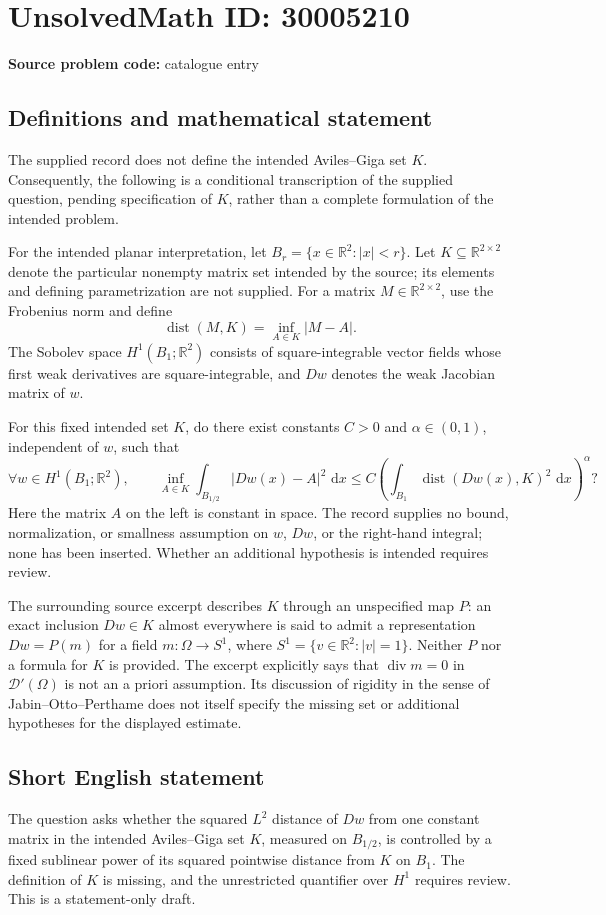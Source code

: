 \documentclass[11pt]{article}
\newcommand{\R}{\mathbb{R}}
\newcommand{\dd}{\,\mathrm{d}}
\begin{document}
\section*{UnsolvedMath ID: 30005210}
\textbf{Source problem code:} catalogue entry
\subsection{Definitions and mathematical statement}
The supplied record does not define the intended Aviles--Giga set \(K\). Consequently, the following is a conditional transcription of the supplied question, pending specification of \(K\), rather than a complete formulation of the intended problem.

For the intended planar interpretation, let \(B_r=\{x\in\R^2:|x|<r\}\). Let \(K\subseteq\R^{2\times2}\) denote the particular nonempty matrix set intended by the source; its elements and defining parametrization are not supplied. For a matrix \(M\in\R^{2\times2}\), use the Frobenius norm and define
\[
\operatorname{dist}(M,K)=\inf_{A\in K}|M-A|.
\]
The Sobolev space \(H^1(B_1;\R^2)\) consists of square-integrable vector fields whose first weak derivatives are square-integrable, and \(Dw\) denotes the weak Jacobian matrix of \(w\).

For this fixed intended set \(K\), do there exist constants \(C>0\) and \(\alpha\in(0,1)\), independent of \(w\), such that
\[
\forall w\in H^1(B_1;\R^2),\qquad
\inf_{A\in K}\int_{B_{1/2}}|Dw(x)-A|^2\,\dd x
\leq
C\left(\int_{B_1}\operatorname{dist}(Dw(x),K)^2\,\dd x\right)^\alpha?
\]
Here the matrix \(A\) on the left is constant in space. The record supplies no bound, normalization, or smallness assumption on \(w\), \(Dw\), or the right-hand integral; none has been inserted. Whether an additional hypothesis is intended requires review.

The surrounding source excerpt describes \(K\) through an unspecified map \(P\): an exact inclusion \(Dw\in K\) almost everywhere is said to admit a representation \(Dw=P(m)\) for a field \(m:\Omega\to S^1\), where \(S^1=\{v\in\R^2:|v|=1\}\). Neither \(P\) nor a formula for \(K\) is provided. The excerpt explicitly says that \(\operatorname{div}m=0\) in \(\mathcal D'(\Omega)\) is not an a priori assumption. Its discussion of rigidity in the sense of Jabin--Otto--Perthame does not itself specify the missing set or additional hypotheses for the displayed estimate.
\subsection{Short English statement}
The question asks whether the squared \(L^2\) distance of \(Dw\) from one constant matrix in the intended Aviles--Giga set \(K\), measured on \(B_{1/2}\), is controlled by a fixed sublinear power of its squared pointwise distance from \(K\) on \(B_1\). The definition of \(K\) is missing, and the unrestricted quantifier over \(H^1\) requires review. This is a statement-only draft.
\end{document}
